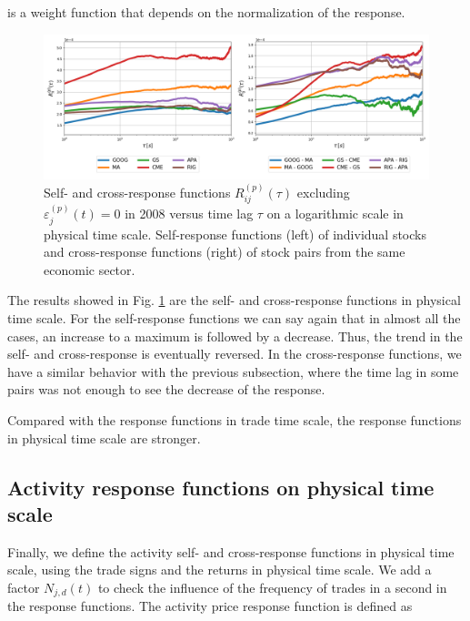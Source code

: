 is a weight function that depends on the normalization of the response.

\begin{figure}[htbp]
    \centering
    \includegraphics[width=\textwidth]
    {figures/03_responses_physical_scale_2008.png}
    \caption{Self- and cross-response functions
             $R^{\left(p\right)}_{ij}\left(\tau\right)$ excluding
             $\varepsilon^{\left(p\right)}_{j}\left(t\right) = 0$ in 2008
             versus time lag $\tau$ on a logarithmic scale in physical time
             scale. Self-response functions (left) of individual stocks and
             cross-response functions (right) of stock pairs from the same
             economic sector.}
    \label{fig:market_response_time_scale}
\end{figure}

The results showed in Fig. \ref{fig:market_response_time_scale} are the
self- and cross-response functions in physical time scale. For the
self-response functions we can say again that in almost all the cases, an
increase to a maximum is followed by a decrease. Thus, the trend in the self-
and cross-response is eventually reversed.
In the cross-response functions, we have a similar behavior with the previous
subsection, where the time lag in some pairs was not enough to see the decrease
of the response.

Compared with the response functions in trade time scale, the response functions
in physical time scale are stronger.

\subsection{Activity response functions on physical time scale}
\label{subsec:activity_response_function}

Finally, we define the activity self- and cross-response functions in physical
time scale, using the trade signs and the returns in physical time scale.
We add a factor $N_{j,d} \left(t \right)$ to check the influence of the
frequency of trades in a second in the response functions. The activity price
response function is defined as

